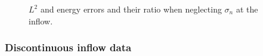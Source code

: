 \begin{figure}[h!]
\centering
{}
\caption{$L^2$ and energy errors and their ratio when neglecting $\sigma_n$ at the inflow.}
\label{ratios_noSigma}
\end{figure}

\subsubsection{Discontinuous inflow data}


